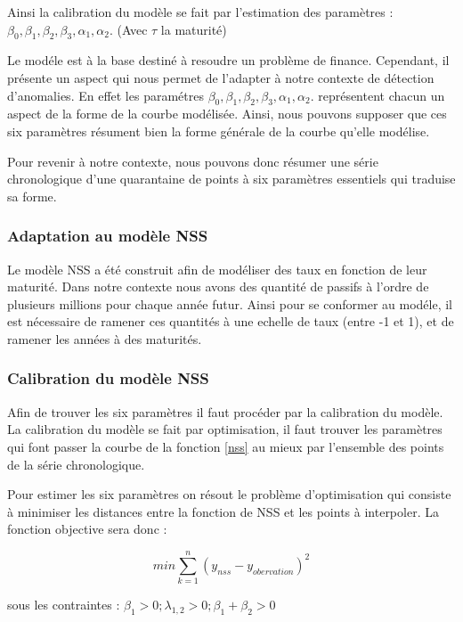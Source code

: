 Ainsi la calibration du modèle se fait par l'estimation des paramètres : $ \beta_{0},\beta_{1},\beta_{2},\beta_{3},\alpha_{1},\alpha_{2}. $ (Avec $ \tau $ la maturité)

Le modéle est à la base destiné à resoudre un problème de finance. Cependant, il présente un aspect qui nous permet de l'adapter à notre contexte de détection d'anomalies. En effet les paramétres $ \beta_{0},\beta_{1},\beta_{2},\beta_{3},\alpha_{1},\alpha_{2}. $  représentent chacun un aspect de la forme de la courbe modélisée. Ainsi, nous pouvons supposer que ces six paramètres résument bien la forme générale de la courbe qu'elle modélise. 

Pour revenir à notre contexte, nous pouvons donc résumer une série chronologique d'une quarantaine de points à six paramètres essentiels qui traduise sa forme.

\subsubsection{Adaptation au modèle NSS}

Le modèle NSS a été construit afin de modéliser des taux en fonction de leur maturité. Dans notre contexte nous avons des quantité de passifs à l'ordre de plusieurs millions pour chaque année futur. Ainsi pour se conformer au modéle, il est nécessaire de ramener ces quantités à une echelle de taux (entre -1 et 1), et de ramener les années à des maturités.

\subsubsection{Calibration du modèle NSS}

Afin de trouver les six paramètres il faut procéder par la calibration du modèle. La calibration du modèle se fait par optimisation, il faut trouver les paramètres qui font passer la courbe de la fonction \eqref{nss} au mieux par l'ensemble des points de la série chronologique. 

Pour estimer les six paramètres on résout le problème d'optimisation qui consiste à minimiser les distances entre la fonction de NSS et les points à interpoler. La fonction objective sera donc :

\begin{equation}
min\sum_{k=1}^n (y_{nss}-y_{obervation})^{2}
\label{obj}
\end{equation}

sous les contraintes : $ \beta_{1} > 0; \lambda_{1,2} > 0; \beta_{1}+\beta_{2}>0 $

